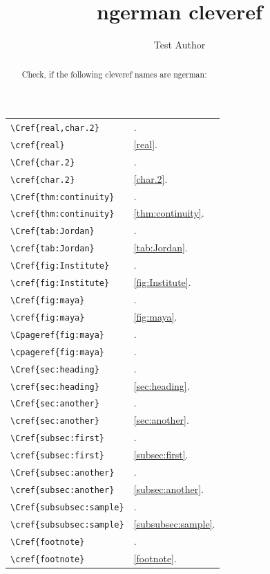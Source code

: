 \documentclass{snapshotmfo}
\author{Test Author}
\title{ngerman cleveref}
\begin{document}

\begin{abstract}
Check, if the following cleveref names are ngerman:
\end{abstract}

\noindent\begin{longtable}{@{}l@{\quad yields\quad}l@{}}
	\verb+\Cref{real,char.2}+      &\Cref{real,char.2}.\\
	\verb+\cref{real}+             &\cref{real}.\\[1ex]
	\verb+\Cref{char.2}+           &\Cref{char.2}.\\
	\verb+\cref{char.2}+           &\cref{char.2}.\\[1ex]
	\verb+\Cref{thm:continuity}+   &\Cref{thm:continuity}.\\
	\verb+\cref{thm:continuity}+   &\cref{thm:continuity}.\\[1ex]
	\verb+\Cref{tab:Jordan}+       &\Cref{tab:Jordan}.\\
	\verb+\cref{tab:Jordan}+       &\cref{tab:Jordan}.\\[1ex]
	\verb+\Cref{fig:Institute}+    &\Cref{fig:Institute}.\\
	\verb+\cref{fig:Institute}+    &\cref{fig:Institute}.\\[1ex]
	\verb+\Cref{fig:maya}+         &\Cref{fig:maya}.\\
	\verb+\cref{fig:maya}+         &\cref{fig:maya}.\\[1ex]
	\verb+\Cpageref{fig:maya}+     &\Cpageref{fig:maya}.\\
	\verb+\cpageref{fig:maya}+     &\cpageref{fig:maya}.\\[1ex]
	\verb+\Cref{sec:heading}+      &\Cref{sec:heading}.\\
	\verb+\cref{sec:heading}+      &\cref{sec:heading}.\\[1ex]
	\verb+\Cref{sec:another}+      &\Cref{sec:another}.\\
	\verb+\cref{sec:another}+      &\cref{sec:another}.\\[1ex]
	\verb+\Cref{subsec:first}+     &\Cref{subsec:first}.\\
	\verb+\cref{subsec:first}+     &\cref{subsec:first}.\\[1ex]
	\pagebreak
	\verb+\Cref{subsec:another}+   &\Cref{subsec:another}.\\
	\verb+\cref{subsec:another}+   &\cref{subsec:another}.\\[1ex]
	\verb+\Cref{subsubsec:sample}+ &\Cref{subsubsec:sample}.\\
	\verb+\cref{subsubsec:sample}+ &\cref{subsubsec:sample}.\\[1ex]
	\verb+\Cref{footnote}+         &\Cref{footnote}.\\
	\verb+\cref{footnote}+         &\cref{footnote}.\\
\end{longtable}
\end{document}
